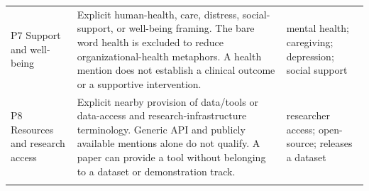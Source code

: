 \begin{longtable}{@{}p{}p{}p{}@{}}
P7 Support and well-being & Explicit human-health, care, distress, social-support, or well-being framing. The bare word health is excluded to reduce organizational-health metaphors. A health mention does not establish a clinical outcome or a supportive intervention. & mental health; caregiving; depression; social support \\ \addlinespace
P8 Resources and research access & Explicit nearby provision of data/tools or data-access and research-infrastructure terminology. Generic API and publicly available mentions alone do not qualify. A paper can provide a tool without belonging to a dataset or demonstration track. & researcher access; open-source; releases a dataset \\ \addlinespace
\end{longtable}
\endgroup
